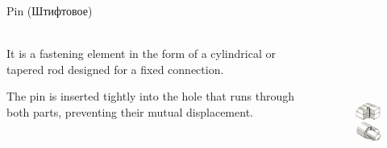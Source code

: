 \documentclass[aspectratio=169]{beamer}
\begin{document}
\begin{frame}[t]{Pin (Штифтовое)}
    \framesubtitle{}
    \begin{columns}[T,onlytextwidth]
        \begin{column}{0.49\textwidth}
            It is a fastening element in the form of a cylindrical or tapered rod designed for a fixed connection. 
            
            The pin is inserted tightly into the hole that runs through both parts, preventing their mutual displacement.
        \end{column}
        \begin{column}{0.49\textwidth}
            \begin{figure}[H]
                \centering\includegraphics[height=5cm,width=1\textwidth,keepaspectratio]{stift.jpg}
                \label{fig:stift.jpg}
            \end{figure}
        \end{column}
    \end{columns}
\end{frame}
\end{document}
